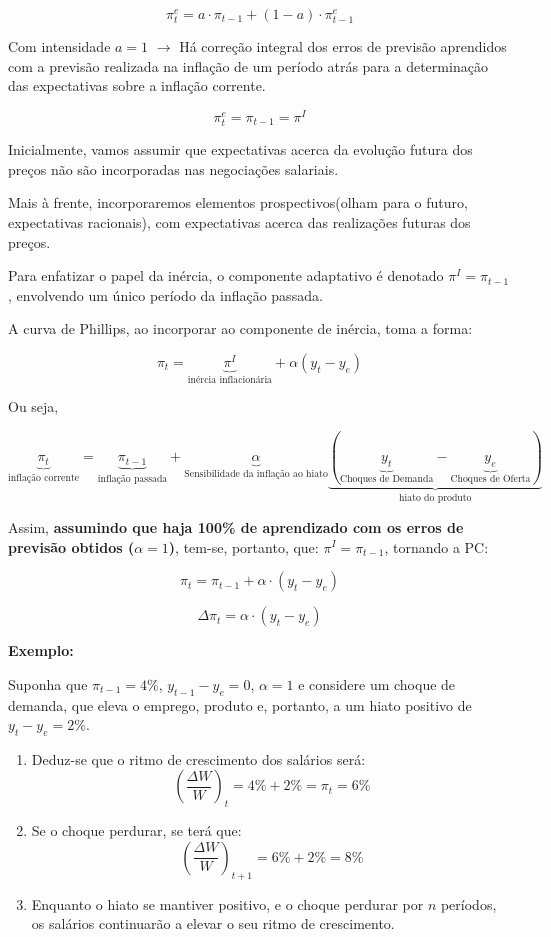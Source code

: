 \documentclass[a4paper,12pt]{article}[abntex2]
\begin{document}
\[
\pi_t^e = a \cdot \pi_{t-1} + (1 - a) \cdot \pi_{t-1}^e
\]

Com intensidade $a = 1$ $\rightarrow$ Há correção integral dos erros de previsão aprendidos com a previsão realizada na inflação de um período atrás para a determinação das expectativas sobre a inflação corrente.

\[
\pi_t^e = \pi_{t-1} = \pi^I
\]

Inicialmente, vamos assumir que expectativas acerca da evolução futura dos preços não são incorporadas nas negociações salariais.

Mais à frente, incorporaremos elementos prospectivos(olham para o futuro, expectativas racionais), com expectativas acerca das realizações futuras dos preços.

Para enfatizar o papel da inércia, o componente adaptativo é denotado $\pi^I = \pi_{t-1}$, envolvendo um único período da inflação passada.

A curva de Phillips, ao incorporar ao componente de inércia, toma a forma:

\[
\pi_t = \underbrace{\pi^I}_\text{inércia inflacionária} + \alpha (y_t - y_e)
\]

Ou seja,

\[
\underbrace{\pi_t}_{\text{inflação corrente}} = 
\underbrace{\pi_{t-1}}_{\text{inflação passada}} + 
\underbrace{\alpha}_{\text{Sensibilidade da inflação ao hiato}}
\underbrace{(\underbrace{y_t}_\text{Choques de Demanda} - \underbrace{y_e}_\text{Choques de Oferta})}_{\text{hiato do produto}}
\]


Assim, \textbf{assumindo que haja 100\% de aprendizado com os erros de previsão obtidos ($\alpha = 1$)}, tem-se, portanto, que: $\pi^I = \pi_{t-1}$, tornando a PC:

\[
\pi_t = \pi_{t-1} + \alpha \cdot (y_t - y_e)
\]

\[
\Delta \pi_t = \alpha \cdot (y_t - y_e)
\]


\textbf{Exemplo:}

Suponha que $\pi_{t-1} = 4\%$, $y_{t-1} - y_e = 0$, $\alpha = 1$ e considere um choque de demanda, que eleva o emprego, produto e, portanto, a um hiato positivo de $y_t - y_e = 2\%$.

\begin{enumerate}
    \item Deduz-se que o ritmo de crescimento dos salários será: 
    \[
    \left( \frac{\Delta W}{W} \right)_t = 4\% + 2\% = \pi_t = 6\%
    \]
    
    \item Se o choque perdurar, se terá que:
    \[
    \left( \frac{\Delta W}{W} \right)_{t+1} = 6\% + 2\% = 8\%
    \]

    \item Enquanto o hiato se mantiver positivo, e o choque perdurar por $n$ períodos, os salários continuarão a elevar o seu ritmo de crescimento.
\end{enumerate}
\end{document}
